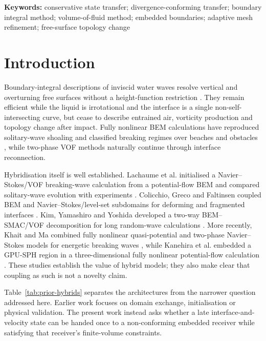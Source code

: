 \documentclass[11pt]{article}
\begin{document}
\noindent\textbf{Keywords:} conservative state transfer; divergence-conforming
transfer; boundary integral method; volume-of-fluid method; embedded
boundaries; adaptive mesh refinement; free-surface topology change

\section{Introduction}

Boundary-integral descriptions of inviscid water waves resolve vertical and
overturning free surfaces without a height-function restriction
\cite{LonguetHigginsCokelet1976,DoldPeregrine1986,BakerMeironOrszag1982}.
They remain efficient while the liquid is irrotational and the interface is a
single non-self-intersecting curve, but cease to describe entrained air,
vorticity production and topology change after impact.  Fully nonlinear BEM
calculations have reproduced solitary-wave shoaling and classified breaking
regimes over beaches and obstacles \cite{GrilliSvendsenSubramanya1997}, while
two-phase VOF methods naturally continue through interface reconnection.

Hybridisation itself is well established.  Lachaume et al. initialised a
Navier--Stokes/VOF breaking-wave calculation from a potential-flow BEM and
compared solitary-wave evolution with experiments \cite{LachaumeEtAl2003}.
Colicchio, Greco and Faltinsen coupled BEM and Navier--Stokes/level-set
subdomains for deforming and fragmented interfaces
\cite{ColicchioGrecoFaltinsen2006}.  Kim, Yamashiro and Yoshida developed a
two-way BEM--SMAC/VOF decomposition for long random-wave calculations
\cite{KimYamashiroYoshida2010}.  More recently, Khait and Ma combined fully
nonlinear quasi-potential and two-phase Navier--Stokes models for energetic
breaking waves \cite{KhaitMa2021}, while Kanehira et al. embedded a GPU-SPH
region in a three-dimensional fully nonlinear potential-flow calculation
\cite{KanehiraEtAl2026}.  These studies establish the value of hybrid models;
they also make clear that coupling as such is not a novelty claim.

Table~\ref{tab:prior-hybrids} separates the architectures from the narrower
question addressed here.  Earlier work focuses on domain exchange,
initialisation or physical validation.  The present work instead asks whether
a late interface-and-velocity state can be handed once to a non-conforming
embedded receiver while satisfying that receiver's finite-volume constraints.
\end{document}

